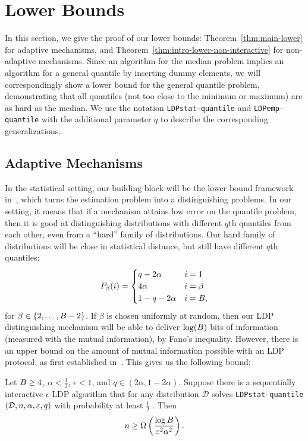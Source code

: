 \section{Lower Bounds}\label{sec:lower-bound}
In this section, we give the proof of our lower bounds: Theorem~\ref{thm:main-lower} for adaptive mechanisms, and Theorem~\ref{thm:intro-lower-non-interactive} for non-adaptive mechanisms. Since an algorithm for the median problem implies an algorithm for a general quantile by inserting dummy elements, we will correspondingly show a lower bound for the general quantile problem, demonstrating that all quantiles (not too close to the minimum or maximum) are as hard as the median. We use the notation \texttt{LDPstat-quantile} and \texttt{LDPemp-quantile} with the additional parameter $q$ to describe the corresponding generalizations.

\subsection{Adaptive Mechanisms}

In the statistical setting, our building block will be the lower bound framework in~\cite{duchi2013local}, which turns the estimation problem into a distinguishing problems. In our setting, it means that if a mechanism attains low error on the quantile problem, then it is good at distinguishing distributions with different $q$th quantiles from each other, even from a ``hard'' family of distributions. Our hard family of distributions will be close in statistical distance, but still have different $q$th quantiles:
    \[
        P_\beta(i) = \begin{cases}
        q - 2\alpha & i = 1 \\
        4\alpha & i = \beta \\
        1-q-2\alpha & i = B,
    \end{cases}
    \]
for $\beta \in \{2, \ldots, B-2\}$. If $\beta$ is chosen uniformly at random, then our LDP distinguishing mechanism will be able to deliver $\log(B)$ bits of information (measured with the mutual information), by Fano's inequality. However, there is an upper bound on the amount of mutual information possible with an LDP protocol, as first established in~\cite{duchi2013local}. This gives us the following bound:

\begin{theorem}\label{thm:stat-lb-adapt}
    Let $B \geq 4$, $\alpha < \frac{1}{2}$, $\epsilon < 1$, and $q\in (2\alpha, 1-2\alpha)$. Suppose there is a sequentially interactive $\epsilon$-LDP algorithm that  for any distribution $\mathcal{D}$ solves \texttt{LDPstat-quantile}$(\mathcal{D},n,\alpha,\varepsilon,q)$ with probability at least $\frac{1}{2}$ . Then 
    \[
        n \geq \Omega\left( \frac{\log B}{ \varepsilon^2\alpha^2}\right).
    \]
\end{theorem}

